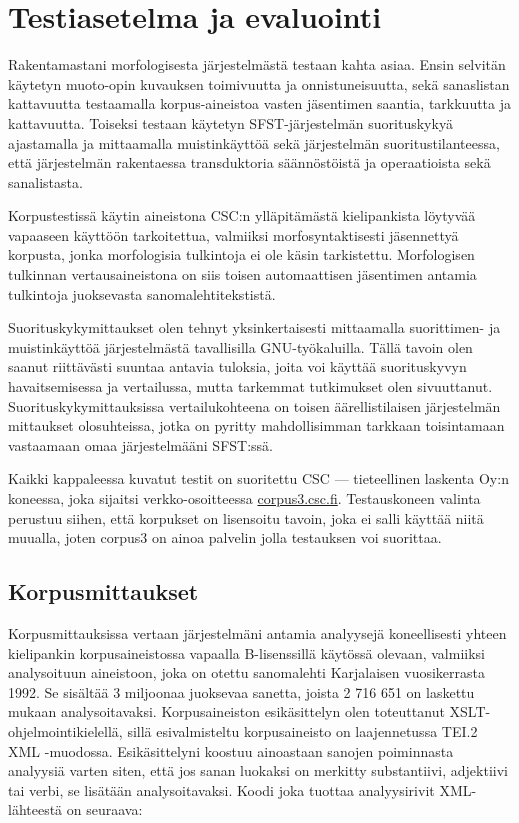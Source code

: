 \documentclass[free]{flammie}
\begin{document}
\section{Testiasetelma ja evaluointi} \label{sec:eval}

Rakentamastani morfologisesta järjestelmästä testaan kahta asiaa. Ensin selvitän
käytetyn muoto-opin kuvauksen toimivuutta ja onnistuneisuutta, sekä sanaslistan
kattavuutta testaamalla korpus-aineistoa vasten jäsentimen saantia, tarkkuutta ja
kattavuutta. Toiseksi testaan käytetyn SFST-järjestelmän suorituskykyä ajastamalla ja mittaamalla muistinkäyttöä sekä järjestelmän suoritustilanteessa, että järjestelmän rakentaessa transduktoria säännöstöistä ja operaatioista sekä sanalistasta.

Korpustestissä käytin aineistona CSC:n ylläpitämästä kielipankista löytyvää vapaaseen käyttöön tarkoitettua, valmiiksi morfosyntaktisesti jäsennettyä korpusta,
jonka morfologisia tulkintoja ei ole käsin tarkistettu. Morfologisen tulkinnan vertausaineistona on siis toisen automaattisen jäsentimen antamia tulkintoja juoksevasta sanomalehtitekstistä.

Suorituskykymittaukset olen tehnyt yksinkertaisesti mittaamalla suorittimen- ja
muistinkäyttöä järjestelmästä tavallisilla GNU-työkaluilla. Tällä tavoin olen saanut riittävästi suuntaa antavia tuloksia, joita voi käyttää suorituskyvyn havaitsemisessa ja vertailussa, mutta tarkemmat tutkimukset olen sivuuttanut. Suorituskykymittauksissa vertailukohteena on toisen äärellistilaisen järjestelmän mittaukset
olosuhteissa, jotka on pyritty mahdollisimman tarkkaan toisintamaan vastaamaan
omaa järjestelmääni SFST:ssä.

Kaikki kappaleessa kuvatut testit on suoritettu CSC — tieteellinen laskenta Oy:n
koneessa, joka sijaitsi verkko-osoitteessa \url{corpus3.csc.fi}. Testauskoneen
valinta perustuu siihen, että korpukset on lisensoitu tavoin, joka ei salli käyttää
niitä muualla, joten corpus3 on ainoa palvelin jolla testauksen voi suorittaa.

\subsection{Korpusmittaukset} \label{subsec:korpusmittaukset}

Korpusmittauksissa vertaan järjestelmäni antamia analyysejä koneellisesti yhteen
kielipankin korpusaineistossa vapaalla B-lisenssillä käytössä olevaan, valmiiksi
analysoituun aineistoon, joka on otettu sanomalehti Karjalaisen vuosikerrasta
1992. Se sisältää 3 miljoonaa juoksevaa sanetta, joista 2 716 651 on laskettu
mukaan analysoitavaksi. Korpusaineiston esikäsittelyn olen toteuttanut XSLT-ohjelmointikielellä, sillä esivalmisteltu korpusaineisto on laajennetussa TEI.2
XML -muodossa. Esikäsittelyni koostuu ainoastaan sanojen poiminnasta analyysiä varten siten, että jos sanan luokaksi on merkitty substantiivi, adjektiivi tai verbi, se lisätään analysoitavaksi. Koodi joka tuottaa analyysirivit XML-lähteestä on
seuraava:
\end{document}

